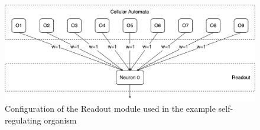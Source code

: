 \begin{figure}[ht]
  \centering
  \includegraphics[width=\linewidth]{fig/example-readout}
  \caption[Example Readout configuration]{
    Configuration of the Readout module used in the example
    self-regulating organism
  }
  \label{fig:example-setup-readout}
\end{figure}

